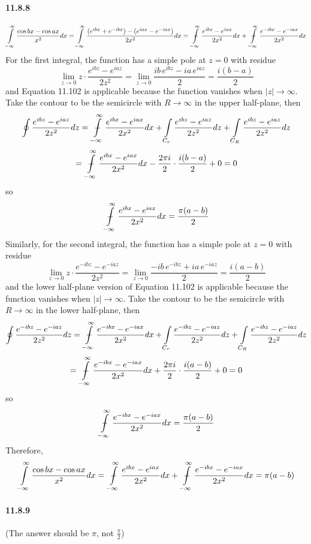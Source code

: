 \documentclass[a4paper]{article}
\begin{document}
\paragraph{11.8.8}
\[
\int\displaylimits_{-\infty}^\infty\frac{\cos bx-\cos ax}{x^2}dx=\int\displaylimits_{-\infty}^\infty\frac{(e^{ibx}+e^{-ibx})-(e^{iax}-e^{-iax})}{2x^2}dx=\ddashint\displaylimits_{-\infty}^\infty\frac{e^{ibx}-e^{iax}}{2x^2}dx+\ddashint\displaylimits_{-\infty}^\infty\frac{e^{-ibx}-e^{-iax}}{2x^2}dx
\]
For the first integral, the function has a simple pole at $z=0$ with residue
\[
\lim_{z\to0}z\cdot\frac{e^{ibz}-e^{iaz}}{2z^2}=\lim_{z\to0}\frac{ib\,e^{ibz}-ia\,e^{iaz}}{2}=\frac{i(b-a)}{2}
\]
and Equation 11.102 is applicable because the function vanishes when $|z|\to\infty$. Take the contour to be the semicircle with $R\to\infty$ in the upper half-plane, then
\[
\oint\frac{e^{ibz}-e^{iaz}}{2z^2}dz=\ddashint\displaylimits_{-\infty}^\infty\frac{e^{ibx}-e^{iax}}{2x^2}dx+\int\displaylimits_{C_r}\frac{e^{ibz}-e^{iaz}}{2z^2}dz+\int\displaylimits_{C_R}\frac{e^{ibz}-e^{iaz}}{2z^2}dz
\]
\[
=\ddashint\displaylimits_{-\infty}^\infty\frac{e^{ibx}-e^{iax}}{2x^2}dx-\frac{2\pi i}{2}\cdot\frac{i(b-a)}{2}+0=0
\]
so
\[
\ddashint\displaylimits_{-\infty}^\infty\frac{e^{ibx}-e^{iax}}{2x^2}dx=\frac{\pi(a-b)}{2}
\]
Similarly, for the second integral, the function has a simple pole at $z=0$ with residue
\[
\lim_{z\to0}z\cdot\frac{e^{-ibz}-e^{-iaz}}{2z^2}=\lim_{z\to0}\frac{-ib\,e^{-ibz}+ia\,e^{-iaz}}{2}=\frac{i(a-b)}{2}
\]
and the lower half-plane version of Equation 11.102 is applicable because the function vanishes when $|z|\to\infty$. Take the contour to be the semicircle with $R\to\infty$ in the lower half-plane, then
\[
\oint\frac{e^{-ibz}-e^{-iaz}}{2z^2}dz=\ddashint\displaylimits_{-\infty}^\infty\frac{e^{-ibx}-e^{-iax}}{2x^2}dx+\int\displaylimits_{C_r}\frac{e^{-ibz}-e^{-iaz}}{2z^2}dz+\int\displaylimits_{C_R}\frac{e^{-ibz}-e^{-iaz}}{2z^2}dz
\]
\[
=\ddashint\displaylimits_{-\infty}^\infty\frac{e^{-ibx}-e^{-iax}}{2x^2}dx+\frac{2\pi i}{2}\cdot\frac{i(a-b)}{2}+0=0
\]
so
\[
\ddashint\displaylimits_{-\infty}^\infty\frac{e^{-ibx}-e^{-iax}}{2x^2}dx=\frac{\pi(a-b)}{2}
\]
Therefore, 
\[
\int\displaylimits_{-\infty}^\infty\frac{\cos bx-\cos ax}{x^2}dx=\ddashint\displaylimits_{-\infty}^\infty\frac{e^{ibx}-e^{iax}}{2x^2}dx+\ddashint\displaylimits_{-\infty}^\infty\frac{e^{-ibx}-e^{-iax}}{2x^2}dx=\pi(a-b)
\]

\paragraph{11.8.9}
(The answer should be $\pi$, not $\frac{\pi}{2}$)
\end{document}
